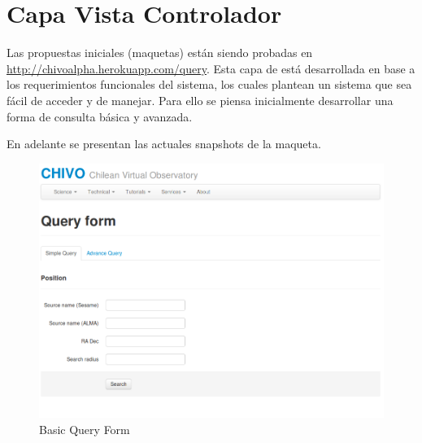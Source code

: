 \section{Capa Vista Controlador}

Las propuestas iniciales (maquetas) están siendo probadas en
\url{http://chivoalpha.herokuapp.com/query}. Esta capa de
está desarrollada en base a los requerimientos funcionales
del sistema, los cuales plantean un sistema que sea fácil
de acceder y de manejar. Para ello se piensa inicialmente
desarrollar una forma de consulta básica y avanzada. 

En adelante se presentan las actuales snapshots de la
maqueta.

\begin{figure}[h!t]
         \begin{center}
                 \includegraphics[width=0.8\textheight]{img/snap1.png}
                 \caption{Basic Query Form}
         \end{center}
\end{figure}

\newpage

